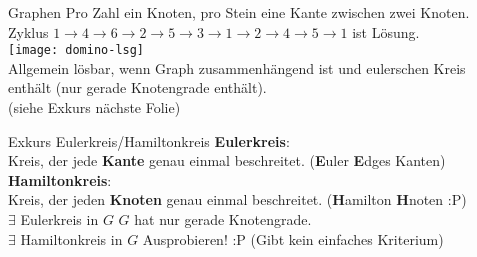 \begin{frame}{Graphen}
	\solutionheading
	Pro Zahl ein Knoten, pro Stein eine Kante zwischen zwei Knoten. \\
	Zyklus $1 \rightarrow 4 \rightarrow 6 \rightarrow 2 \rightarrow 5 \rightarrow 3 \rightarrow 1 \rightarrow 2 \rightarrow 4 \rightarrow 5 \rightarrow 1$ ist Lösung. \\
	\texttt{[image: domino-lsg]} \\
	\pause
	Allgemein lösbar, wenn Graph zusammenhängend ist und eulerschen Kreis enthält (\gdw nur gerade Knotengrade enthält). \\
	{\small (siehe Exkurs nächste Folie)}
\end{frame}

\begin{frame}{Exkurs Eulerkreis/Hamiltonkreis}
	\textbf{Eulerkreis}: \\
	Kreis, der jede \textbf{Kante} genau einmal beschreitet. {\small (\textbf{E}uler \impl \textbf{E}dges \impl Kanten)} \\
	\forcenewline
	\pause
	\textbf{Hamiltonkreis}: \\
	Kreis, der jeden \textbf{Knoten} genau einmal beschreitet. {\small (\textbf{H}amilton \impl \textbf{H}noten :P)} \\
	\forcenewline
	\pause
	$\exists$ Eulerkreis in $G$ \gdw $G$ hat nur gerade Knotengrade. \\
	$\exists$ Hamiltonkreis in $G$ \gdw Ausprobieren! :P (Gibt kein einfaches Kriterium)
\end{frame}



